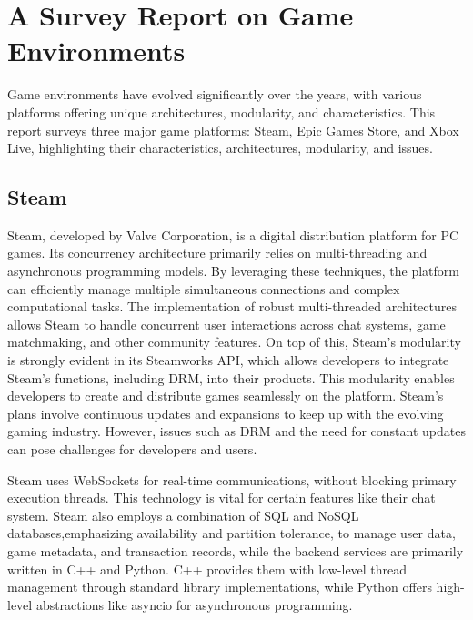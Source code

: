\documentclass[]{project_interim}
\begin{document}
\chapter{A Survey Report on Game Environments}

Game environments have evolved significantly over the years, with various platforms
offering unique architectures, modularity, and characteristics. This report surveys
three major game platforms: Steam, Epic Games Store, and Xbox Live, highlighting
their characteristics, architectures, modularity, and issues.

\section{Steam}
Steam, developed by Valve Corporation, is a digital distribution platform
for PC games. Its concurrency architecture primarily relies on multi-threading and asynchronous
programming models. By leveraging these techniques, the platform can efficiently manage
multiple simultaneous connections and complex computational tasks. The implementation
of robust multi-threaded architectures allows Steam to handle concurrent user interactions
across chat systems, game matchmaking, and other community features. On top of this,
Steam's modularity is strongly evident in its Steamworks API, which allows developers to
integrate Steam's functions, including DRM, into their products.\cite{simmons_decoding_2023, noauthor_steamworks_nodate}
This modularity enables developers to create and distribute games seamlessly on the platform.
Steam's plans involve continuous updates and expansions to keep up with
the evolving gaming industry.\cite{noauthor_steam_nodate1} However, issues such as DRM and the need for
constant updates can pose challenges for developers and users\cite{noauthor_steam_nodate}.

Steam uses WebSockets for real-time communications, without blocking primary execution threads.
This technology is vital for certain features like their chat system.\cite{noauthor_isteamnetworkingsockets_nodate}
Steam also employs a combination of SQL and NoSQL databases\cite{simmons_decoding_2023, djundik_how_2017},emphasizing availability
and partition tolerance, to manage user data, game metadata, and transaction records, while
the backend services are primarily written in C++ and Python.\cite{simmons_decoding_2023}  C++ provides them with low-level thread management through standard
library implementations, while Python offers high-level abstractions like asyncio
for asynchronous programming.
\end{document}
